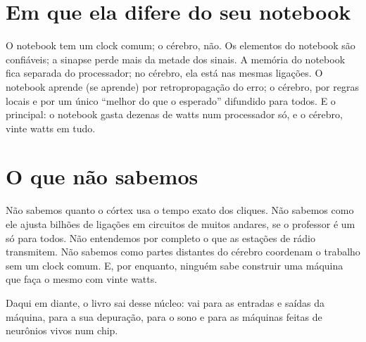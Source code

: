 \section*{Em que ela difere do seu notebook}

O notebook tem um clock comum; o cérebro, não. Os elementos do notebook são confiáveis; a sinapse perde mais da metade dos sinais. A memória do notebook fica separada do processador; no cérebro, ela está nas mesmas ligações. O notebook aprende (se aprende) por retropropagação do erro; o cérebro, por regras locais e por um único ``melhor do que o esperado'' difundido para todos. E o principal: o notebook gasta dezenas de watts num processador só, e o cérebro, vinte watts em tudo.

\section*{O que não sabemos}

Não sabemos quanto o córtex usa o tempo exato dos cliques. Não sabemos como ele ajusta bilhões de ligações em circuitos de muitos andares, se o professor é um só para todos. Não entendemos por completo o que as estações de rádio transmitem. Não sabemos como partes distantes do cérebro coordenam o trabalho sem um clock comum. E, por enquanto, ninguém sabe construir uma máquina que faça o mesmo com vinte watts.

Daqui em diante, o livro sai desse núcleo: vai para as entradas e saídas da máquina, para a sua depuração, para o sono e para as máquinas feitas de neurônios vivos num chip.

